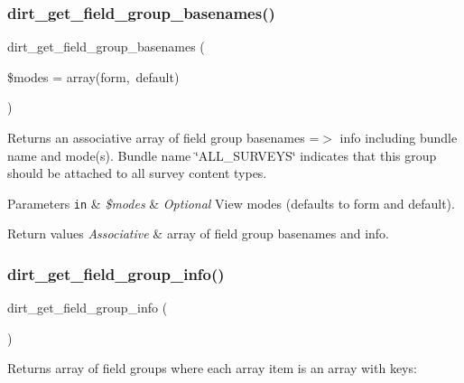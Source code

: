 \subsubsection{\texorpdfstring{dirt\+\_\+get\+\_\+field\+\_\+group\+\_\+basenames()}{dirt\_get\_field\_group\_basenames()}}
{\footnotesize\ttfamily dirt\+\_\+get\+\_\+field\+\_\+group\+\_\+basenames (\begin{DoxyParamCaption}\item[{}]{\$modes = {\ttfamily array(\textquotesingle{}form\textquotesingle{},~\textquotesingle{}default\textquotesingle{})} }\end{DoxyParamCaption})}

Returns an associative array of field group basenames =$>$ info including bundle name and mode(s). Bundle name \char`\"{}\+A\+L\+L\+\_\+\+S\+U\+R\+V\+E\+Y\+S\char`\"{} indicates that this group should be attached to all survey content types.


\begin{DoxyParams}[1]{Parameters}
\mbox{\tt in}  & {\em \$modes} & {\itshape Optional} View modes (defaults to form and default).\\
\hline
\end{DoxyParams}

\begin{DoxyRetVals}{Return values}
{\em Associative} & array of field group basenames and info. \\
\hline
\end{DoxyRetVals}
\mbox{\label{dirt_8field__groups_8inc_ad57a6faa7b4f0fc6c40b2a9d19776ed2}} 
\subsubsection{\texorpdfstring{dirt\+\_\+get\+\_\+field\+\_\+group\+\_\+info()}{dirt\_get\_field\_group\_info()}}
{\footnotesize\ttfamily dirt\+\_\+get\+\_\+field\+\_\+group\+\_\+info (\begin{DoxyParamCaption}{ }\end{DoxyParamCaption})}

Returns array of field groups where each array item is an array with keys\+:

